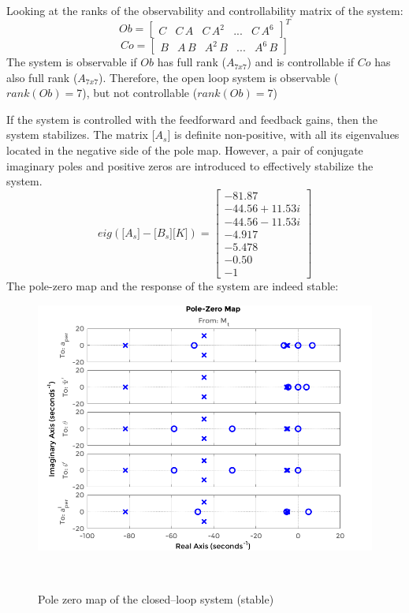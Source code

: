 Looking at the ranks of the observability and controllability matrix of the system: \[Ob=\begin{bmatrix}C & C\,A & C\,A^{2} & ... & C\,A^{6}\end{bmatrix}^{T}\] \[Co=\begin{bmatrix}B & A\,B & A^{2}\,B & ... & A^{6}\,B\end{bmatrix}\]
The system is observable if $Ob$ has full rank ($A_{7x7}$) and is controllable if $Co$ has also full rank ($A_{7x7}$). Therefore, the open loop system is observable ($rank(Ob)=7$), but not controllable ($rank(Ob)=7$)

If the system is controlled with the feedforward and feedback gains, then the system stabilizes. The matrix $\big[A_{s}\big]$ is definite non-positive, with all its eigenvalues located in the negative side of the pole map. However, a pair of conjugate imaginary poles and positive zeros are introduced to effectively stabilize the system.
 \[eig(\big[A_{s}\big]-\big[B_{s}\big]\big[K\big])=\begin{bmatrix}-81.87 \\-44.56 + 11.53i \\-44.56 - 11.53i \\-4.917\\-5.478\\-0.50\\-1\end{bmatrix}\]
The pole-zero map and the response of the system are indeed stable:
 
\begin{figure}[!h]
	\includegraphics[width=1.15\linewidth]{figs/06/control/pole_zero_map_2}
	\caption{Pole zero map of the closed--loop system (stable)}
	\\[-0.5cm]
\end{figure}

